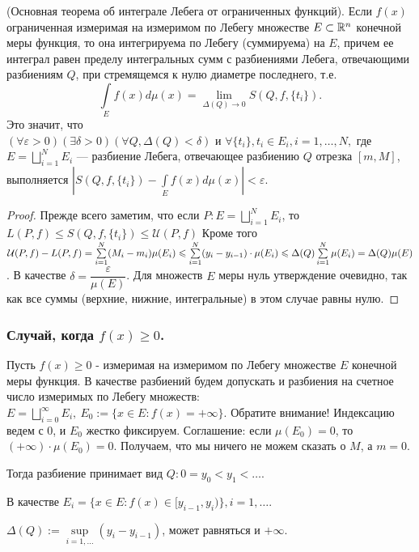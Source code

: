 \begin{theorem}(Основная теорема об интеграле Лебега от ограниченных функций).
	Если $f(x)$ ограниченная измеримая на измеримом по Лебегу множестве $ E\subset\R^n $ конечной меры  функция, то она интегрируема по Лебегу (суммируема) на $E$, причем ее интеграл равен пределу интегральных сумм с разбиениями Лебега, отвечающими разбиениям  $ Q $, при стремящемся к нулю диаметре последнего, т.е. $$\int\limits_E f(x)d\mu(x)=\lim_{\Delta(Q)\to 0}S(Q,f,\{t_i\}).$$
	Это значит, что $(\forall \varepsilon >0)(\exists \delta > 0)(\forall Q, \Delta(Q)<\delta) \text{ и } \forall \{t_i\}, t_i \in E_i, i=1,\ldots, N,$ где $E=\bigsqcup\limits_{i=1}^N E_i$ --- разбиение Лебега, отвечающее разбиению $Q$ отрезка $[m, M]$, выполняется $|S(Q, f, \{t_i\})-\int\limits_E f(x)d\mu(x)|<\varepsilon$.
\end{theorem}

\begin{proof}
	Прежде всего заметим, что если $P: E=\bigsqcup\limits_{i=1}^N E_i$, то\newline $L(P, f)\leqslant S(Q, f, \{t_i\})\leqslant \mathcal{U}(P, f)$ Кроме того $\mathcal{U}(P, f) - L(P, f) = \sum\limits_{i=1}^N(M_i-m_i)\mu(E_i) \?\leqslant \sum\limits_{i=1}^N (y_i-y_{i-1})\cdot\mu(E_i)\leqslant \Delta(Q) \sum\limits_{i=1}^N\mu(E_i)=\Delta(Q)\mu(E)$. В качестве $\delta = \dfrac{\varepsilon}{\mu(E)}$. Для множеств $ E $ меры нуль утверждение очевидно, так как все суммы (верхние, нижние, интегральные) в этом случае равны нулю.
\end{proof}
\subsubsection{Случай, когда $f(x)\geqslant 0$.}
Пусть $f(x)\geqslant 0$ - измеримая на измеримом по Лебегу множестве $E$ конечной меры функция. В качестве разбиений будем допускать и разбиения на счетное число измеримых по Лебегу множеств: $E = \bigsqcup\limits_{i=0 }^{\infty}E_i,\ E_0:=\{x\in E:f(x)=+\infty\}$. Обратите внимание! Индексацию ведем с 0, и $E_0$ жестко фиксируем. Соглашение: если $\mu(E_0)=0$, то $(+\infty)\cdot \mu(E_0)=0$. Получаем, что мы ничего не можем сказать о $M$, а $m=0$. 

Тогда разбиение принимает вид $Q: 0=y_0<y_1<\ldots$. 

В качестве $E_i = \{x\in E: f(x)\in[y_{i-1}, y_i)\}, i=1,\ldots$.

$\Delta(Q):=\sup\limits_{i=1, \ldots}(y_i-y_{i-1})$, может равняться и $+\infty$.


